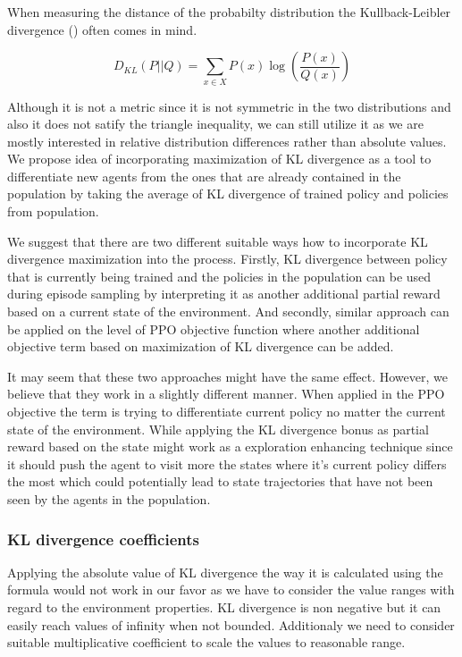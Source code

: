 When measuring the distance of the probabilty distribution the Kullback-Leibler divergence (\cite{KLDivergence}) often comes in mind.

\[
    D_{KL}(P||Q) = \sum_{x \in X}P(x)\log\left(\frac{P(x)}{Q(x)}\right)
\]

Although it is not a metric since it is not symmetric in the two distributions and also it does not satify the triangle inequality, we can still utilize it as we are mostly interested in relative distribution differences rather than absolute values.
We propose idea of incorporating maximization of KL divergence as a tool to differentiate new agents from the ones that are already contained in the population by taking the average of KL divergence of trained policy and policies from population.

We suggest that there are two different suitable ways how to incorporate KL divergence maximization into the process.
Firstly, KL divergence between policy that is currently being trained and the policies in the population can be used during episode sampling by interpreting it as another additional partial reward based on a current state of the environment.
And secondly, similar approach can be applied on the level of PPO objective function where another additional objective term based on maximization of KL divergence can be added.

It may seem that these two approaches might have the same effect.
However, we believe that they work in a slightly different manner.
When applied in the PPO objective the term is trying to differentiate current policy no matter the current state of the environment.
While applying the KL divergence bonus as partial reward based on the state might work as a exploration enhancing technique since it should push the agent to visit more the states where it's current policy differs the most which could potentially lead to state trajectories that have not been seen by the agents in the population.   

\subsubsection{KL divergence coefficients}
Applying the absolute value of KL divergence the way it is calculated using the formula would not work in our favor as we have to consider the value ranges with regard to the environment properties.
KL divergence is non negative but it can easily reach values of infinity when not bounded.
Additionaly we need to consider suitable multiplicative coefficient to scale the values to reasonable range.

